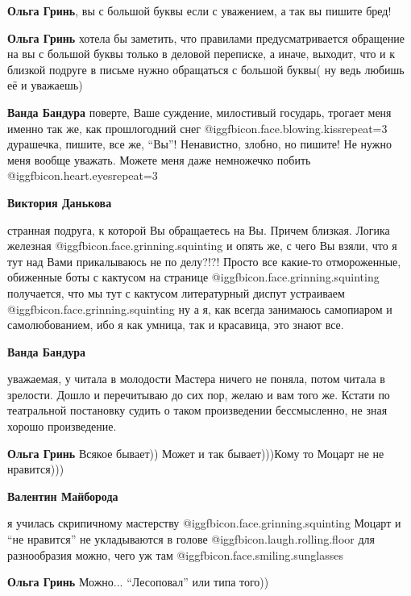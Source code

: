 \begin{itemize}
\begin{itemize}
\begin{itemize}
\textbf{Ольга Гринь}, вы с большой буквы если с уважением, а так вы пишите бред!

\textbf{Ольга Гринь} хотела бы заметить, что правилами предусматривается обращение на вы с большой буквы только в деловой переписке, а иначе, выходит, что и к близкой подруге в письме нужно обращаться с большой буквы( ну ведь любишь её и уважаешь)

\textbf{Ванда Бандура} поверте, Ваше суждение, милостивый государь, трогает меня именно так же, как прошлогодний снег @igg{fbicon.face.blowing.kiss}{repeat=3}  дурашечка, пишите, все же, \enquote{Вы}! Ненавистно, злобно, но пишите! Не нужно меня вообще уважать. Можете меня даже немножечко побить @igg{fbicon.heart.eyes}{repeat=3} 

\textbf{Виктория Данькова} 

странная подруга, к которой Вы обращаетесь на Вы. Причем близкая. Логика
железная @igg{fbicon.face.grinning.squinting}  и опять же, с чего Вы взяли, что
я тут над Вами прикалываюсь не по делу?!?! Просто все какие-то отмороженные,
обиженные боты с кактусом на странице @igg{fbicon.face.grinning.squinting}
получается, что мы тут с кактусом литературный диспут устраиваем
@igg{fbicon.face.grinning.squinting} ну а я, как всегда занимаюсь самопиаром и
самолюбованием, ибо я как умница, так и красавица, это знают все.

\end{itemize} %

\textbf{Ванда Бандура} 

уважаемая, у читала в молодости Мастера ничего не поняла, потом читала в
зрелости. Дошло и перечитываю до сих пор, желаю и вам того же. Кстати по
театральной постановку судить о таком произведении бессмысленно, не зная хорошо
произведение.


\textbf{Ольга Гринь} Всякое бывает)) Может и так бывает)))Кому то Моцарт не не нравится)))

\textbf{Валентин Майборода} 

я училась скрипичному мастерству @igg{fbicon.face.grinning.squinting}  Моцарт и \enquote{не нравится} не укладываются в
голове @igg{fbicon.laugh.rolling.floor}  для разнообразия можно, чего уж там @igg{fbicon.face.smiling.sunglasses} 


\textbf{Ольга Гринь} Можно... \enquote{Лесоповал} или типа того))


\end{itemize}
\end{itemize}
